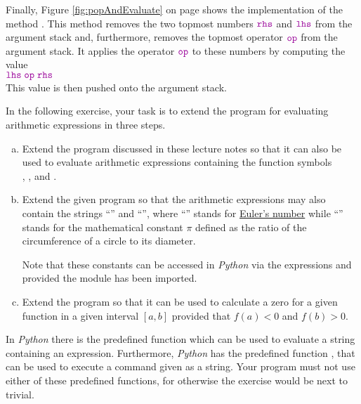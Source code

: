 Finally, Figure \ref{fig:popAndEvaluate} on page \pageref{fig:popAndEvaluate} shows the implementation of the
method .
This method removes the two topmost numbers $\mytt{rhs}$ and $\mytt{lhs}$ from the argument stack and,
furthermore, removes the topmost operator $\mytt{op}$ from the argument stack.  It applies the operator
$\mytt{op}$ to these numbers 
by computing the value 
\\[0.2cm]
\hspace*{1.3cm}
$ \mytt{lhs} \;\mytt{op}\; \mytt{rhs} $
\\[0.2cm]
This value is then pushed onto the argument stack.

\exercise
In the following exercise, your task is to extend the program for evaluating arithmetic expressions in three steps.
\begin{enumerate}[(a)]
\item Extend the program discussed in these lecture notes so that it can also be used to evaluate
      arithmetic expressions containing the function symbols
      \\[0.2cm]
      \hspace*{1.3cm}
      , , and .
\item Extend the given program so that the arithmetic expressions may also contain 
      the strings ``'' and ``'', where ``'' stands for 
      \href{http://en.wikipedia.org/wiki/E_(mathematical_constant)}{Euler's number} 
      while ``'' stands for the mathematical constant
      \href{http://en.wikipedia.org/wiki/Pi}{$\pi$} defined as the ratio of the circumference of a
      circle to its diameter. 

      Note that these constants can be accessed in \textsl{Python} via the expressions 
      and  provided the module  has been imported.
\item Extend the program so that it can be used to calculate a zero for a given function in a given
      interval $[a,b]$ provided that $f(a) < 0$ and $f(b) > 0$.  
\end{enumerate}
In \textsl{Python} there is the predefined function  which can be used to evaluate a string
containing an expression.  Furthermore, \textsl{Python} has the predefined function , that can be
used to execute a command given as a string.  Your program must not use either of these predefined functions,
for otherwise the exercise would be next to trivial.
\eox


